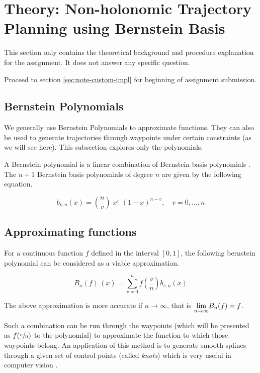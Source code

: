 
\section{Theory: Non-holonomic Trajectory Planning using Bernstein Basis}

\label{sec:theory-nhtraj-bernstein}

This section only contains the theoretical background and procedure explanation for the assignment. It does not answer any specific question.

Proceed to section \ref{sec:note-custom-impl} for beginning of assignment submission.

\subsection{Bernstein Polynomials}

We generally use Bernstein Polynomials to approximate functions. They can also be used to generate trajectories through waypoints under certain constraints (as we will see here). This subsection explores only the polynomials.

A Bernstein polynomial is a linear combination of Bernstein basis polynomials \footnotemark[1]. The $n+1$ Bernstein basis polynomials of degree $n$ are given by the following equation.

\begin{equation}
    b_{v,n}(x) = \binom{n}{v} \; x^v \; (1-x)^{n-v}, \quad v = 0,\dots,n
    \label{eq:bernstein-basis-term}
\end{equation}

\subsection{Approximating functions}

For a continuous function $f$ defined in the interval $[0, 1]$, the following bernstein polynomial can be considered as a viable approximation.

\begin{equation}
    B_{n}(f)\,(x) = \sum_{v=0}^{n} f \left ( \frac{v}{n} \right ) b_{v, n} (x)
    \label{eq:bernstein-approx-func}
\end{equation}

The above approximation is more accurate if $n\rightarrow \infty$, that is $\underset{n \rightarrow \infty}{\textup{lim}} B_n(f) = f$.

Such a combination can be run through the waypoints (which will be presented as $f(\sfrac{v}{n})$ to the polynomial) to approximate the function to which those waypoints belong. An application of this method is to generate smooth splines through a given set of control points (called \emph{knots}) which is very useful in computer vision \footnotemark[2]. 


